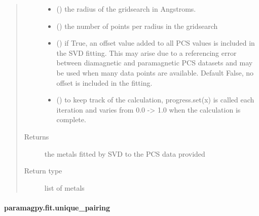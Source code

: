 \documentclass[a4paper,10pt,english,openany,oneside]{sphinxmanual}
\begin{document}
\begin{fulllineitems}
\begin{quote}
\begin{description}
\begin{itemize}
\item {} 
 (\sphinxstyleliteralemphasis{\sphinxupquote{, }}) \textendash{} the radius of the gridsearch in Angstroms.

\item {} 
 (\sphinxstyleliteralemphasis{\sphinxupquote{, }}) \textendash{} the number of points per radius in the gridsearch

\item {} 
 (\sphinxstyleliteralemphasis{\sphinxupquote{, }}) \textendash{} if True, an offset value added to all PCS values is included in
the SVD fitting. This may arise due to a referencing error between
diamagnetic and paramagnetic PCS datasets and may be used when
many data points are available.
Default False, no offset is included in the fitting.

\item {} 
 (\sphinxstyleliteralemphasis{\sphinxupquote{, }}) \textendash{} to keep track of the calculation, progress.set(x) is called each
iteration and varies from 0.0 -\textgreater{} 1.0 when the calculation is complete.

\end{itemize}

\item[{Returns}] \leavevmode
{} \textendash{} the metals fitted by SVD to the PCS data provided

\item[{Return type}] \leavevmode
list of metals

\end{description}\end{quote}

\end{fulllineitems}



\paragraph{paramagpy.fit.unique\_pairing}
\label{\detokenize{reference/generated/paramagpy.fit.unique_pairing:paramagpy-fit-unique-pairing}}\label{\detokenize{reference/generated/paramagpy.fit.unique_pairing::doc}}
\end{document}
